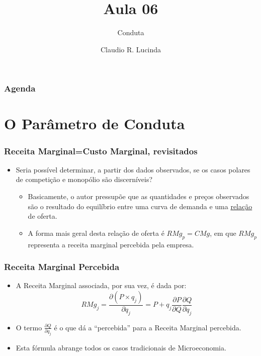 \documentclass{beamer}
\title{Aula 06}
\subtitle{Conduta}
\author{Claudio R. Lucinda}
\institute{FEA-RP/USP}
\date{}
\begin{document}
\frame{\titlepage}
\begin{frame}\frametitle{Agenda}
  \tableofcontents[pausesections]
\end{frame}

\section{O Parâmetro de Conduta}
\begin{frame}\frametitle{Receita Marginal=Custo Marginal, revisitados}
\begin{itemize}
\item Seria possível determinar, a partir dos dados observados, se os casos
polares de competição e monopólio são discerníveis?
\begin{itemize}
\item Basicamente, o autor pressupõe que as quantidades e preços observados
são o resultado do equilíbrio entre uma curva de demanda e uma \uline{relação}
de oferta. 
\item A forma mais geral desta relação de oferta é $RMg_{p}=CMg$, em que
$RMg_{p}$ representa a receita marginal percebida pela empresa. 
\end{itemize}
\end{itemize}
\end{frame}

\begin{frame}\frametitle{Receita Marginal Percebida}

\begin{itemize}
\item A Receita Marginal associada, por sua vez, é dada por:
\[
RMg_{j}=\frac{\partial(P\times q_{j})}{\partial q_{j}}=P+q_{j}\frac{\partial P}{\partial Q}\frac{\partial Q}{\partial q_{j}}
\]
\item O termo $\frac{\partial Q}{\partial q_{j}}$ é o que dá a ``percebida''
para a Receita Marginal percebida.
\item Esta fórmula abrange todos os casos tradicionais de Microeconomia.
\end{itemize}
\end{frame}
\end{document}
